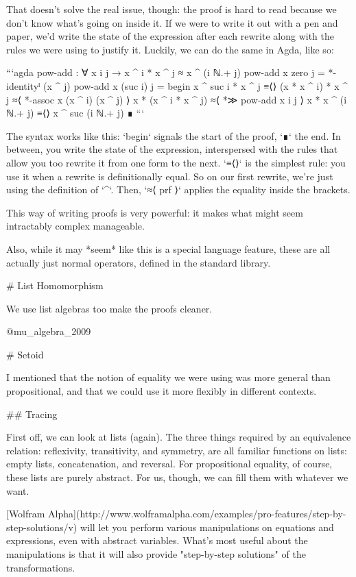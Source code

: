 \documentclass{article}
\begin{document}
That doesn't solve the real issue, though: the proof is hard to read because we
don't know what's going on inside it. If we were to write it out with a pen and
paper, we'd write the state of the expression after each rewrite along with the
rules we were using to justify it. Luckily, we can do the same in Agda, like so:

```agda
pow-add : ∀ x i j → x ^ i * x ^ j ≈ x ^ (i ℕ.+ j)
pow-add x zero j = *-identityˡ (x ^ j)
pow-add x (suc i) j =
  begin
    x ^ suc i * x ^ j
  ≡⟨⟩
    (x * x ^ i) * x ^ j
  ≈⟨ *-assoc x (x ^ i) (x ^ j) ⟩
    x * (x ^ i * x ^ j)
  ≈⟨ *≫ pow-add x i j ⟩
    x * x ^ (i ℕ.+ j)
  ≡⟨⟩
    x ^ suc (i ℕ.+ j)
  ∎
```

The syntax works like this: `begin` signals the start of the proof, `∎` the end.
In between, you write the state of the expression, interspersed with the rules
that allow you too rewrite it from one form to the next. `≡⟨⟩` is the simplest
rule: you use it when a rewrite is definitionally equal. So on our first
rewrite, we're just using the definition of `^`. Then, `≈⟨ prf ⟩` applies the
equality inside the brackets.

This way of writing proofs is very powerful: it makes what might seem
intractably complex manageable. 

Also, while it may *seem* like this is a special language feature, these are all
actually just normal operators, defined in the standard library.

# List Homomorphism

We use list algebras too make the proofs cleaner.

@mu_algebra_2009

# Setoid

I mentioned that the notion of equality we were using was more general than
propositional, and that we could use it more flexibly in different contexts.

## Tracing

First off, we can look at lists (again). The three things required by an
equivalence relation: reflexivity, transitivity, and symmetry, are all familiar
functions on lists: empty lists, concatenation, and reversal. For propositional
equality, of course, these lists are purely abstract. For us, though, we can
fill them with whatever we want.

[Wolfram
Alpha](http://www.wolframalpha.com/examples/pro-features/step-by-step-solutions/v)
will let you perform various manipulations on equations and expressions, even
with abstract variables. What's most useful about the manipulations is that it
will also provide "step-by-step solutions" of the transformations.
\end{document}
